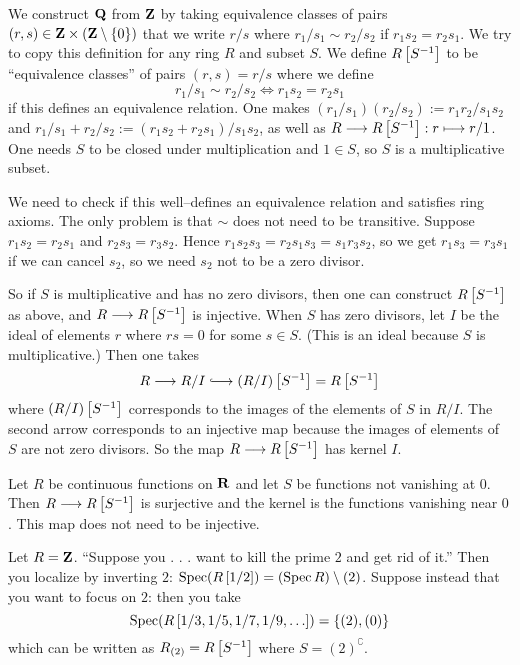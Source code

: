 \documentclass[11pt, oneside,margin=1in]{article}
\begin{document}
We construct $\mathbf Q$ from $\mathbf Z$ by taking equivalence classes of pairs $(r,s)\in \mathbf Z\times (\mathbf Z\setminus\{0\})$ that we write $r/s$ where $r_1/s_1 \sim r_2/s_2$ if $r_1s_2 = r_2s_1$. We try to copy this definition for any ring $R$ and subset $S$. We define $R\left[ S^{-1}\right]$ to be ``equivalence  classes'' of pairs $(r,s) = r/s $ where we define 
$$
r_1/s_1 \sim r_2/s_2 \iff r_1s_2 = r_2s_1
$$
if this defines an equivalence relation. One makes $(r_1/s_1)(r_2/s_2) := r_1r_2/s_1s_2$ and $r_1/s_1 + r_2/s_2 := (r_1s_2 + r_2s_1)/s_1s_2$, as well as $R \longrightarrow R\left[S^{-1}\right]:r\longmapsto r/1$. One needs $S$ to be closed under multiplication and $1\in S$, so $S$ is a multiplicative subset.

We need to check if this well--defines an equivalence relation and satisfies ring axioms. The only problem is that $\sim$ does not need to be transitive. Suppose $r_1s_2 = r_2s_1$ and $r_2s_3 = r_3s_2$. Hence $r_1s_2s_3 = r_2s_1s_3 = s_1r_3s_2$, so we get $r_1s_3 = r_3s_1$ if we can cancel $s_2$, so we need $s_2$ not to be a zero divisor. 

So if $S$ is multiplicative and has no zero divisors, then one can construct $R\left[S^{-1}\right]$ as above, and $R\longrightarrow R\left[S^{-1}\right]$ is injective. When $S$ has zero divisors, let $I$ be the ideal of elements $r$ where $rs=0$ for some $s\in S$. (This is an ideal because $S$ is multiplicative.) Then one takes
$$
R \longrightarrow R/I \lhook\joinrel\longrightarrow (R/I)\left[ S\inv\right] =R\left[ S\inv\right]
$$
where $(R/I)\left[ S^{-1}\right]$ corresponds to the images of the elements of $S$ in $R/I$. The second arrow corresponds to an injective map because the images of elements of $S$ are not zero divisors. So the map $R\longrightarrow R\left[S^{-1}\right]$ has kernel $I$.

\begin{example}
Let $R$ be continuous functions on $\mathbf R$ and let $S$ be functions not vanishing at $0$. Then $R\longrightarrow R\left[S^{-1}\right]$ is surjective and the kernel is the functions vanishing near $0$. This map does not need to be injective.
\end{example}
\begin{example}
Let $R=\mathbf Z$. ``Suppose you . . . want to kill the prime $2$ and get rid of it.'' Then you localize by inverting $2$: $\operatorname{Spec} (R\left[1/2\right]) = (\operatorname{Spec} R)\setminus(2)$. Suppose instead that you want to focus on $2$: then you take
$$
\operatorname{Spec} (R\left[ 1/3,1/5,1/7,1/9,\hdots\right]) = \{ (2), (0)\}
$$
which can be written as $R_{(2)} = R \left[S^{-1}\right]$ where $S={(2)}^\complement$. 
\end{example}
\end{document}
